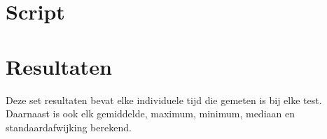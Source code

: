 \section{Script}
\label{sec:script}


\section{Resultaten}
\label{resultaten}

Deze set resultaten bevat elke individuele tijd die gemeten is bij elke test. Daarnaast is ook elk gemiddelde, maximum, minimum, mediaan en standaardafwijking berekend.

